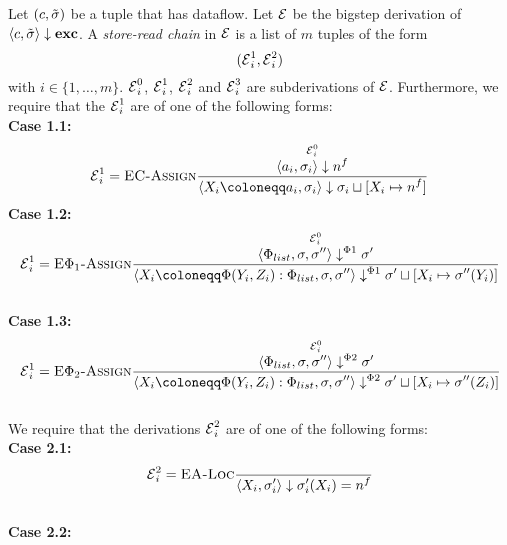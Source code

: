 \begin{definition}
    Let $(c, \tilde{\sigma}{})$ be a tuple that has dataflow.
    Let $\operatorname{\mathcal{E}}$ be the bigstep derivation of
    $\langle c, \tilde{\sigma}{} \rangle \downarrow \textbf{exc}$.
    A \emph{store-read chain} in $\operatorname{\mathcal{E}}$ is a list of $m$ tuples of the form
    \begin{equation*}
        (\operatorname{\mathcal{E}}^1_i, \operatorname{\mathcal{E}}^2_i)
    \end{equation*}
    with $i \in \{1, \ldots, m\}$.
    $\operatorname{\mathcal{E}}^0_i$, $\operatorname{\mathcal{E}}^1_i$, $\operatorname{\mathcal{E}}^2_i$ and $\operatorname{\mathcal{E}}^3_i$ are subderivations of $\operatorname{\mathcal{E}}$.
    Furthermore, we require that the $\operatorname{\mathcal{E}}^1_i$ are of one of the following forms:\\
    \textbf{Case 1.1:}\\
    \begin{align*}
        \E^1_i=\bsrule{EC-Assign}
        {\bigstepderiv{\E^0_i}{a_i}{\sigma_i}{\flagged{}}}
        {\bigstep{\storecmd{X_i}{a_i}}{\store_i}
        {\store_i \dunion [X_i \mapsto \flagged{}]}}
    \end{align*}
    \textbf{Case 1.2:}\\
    \begin{align*}
        \E^1_i=\bsrule{E$\Phi_1$-Assign}
        {\overset{\E^0_i}{\bigsteppl{\defaultphilist}{\store}{\store''}{\store'}}}
        {\bigsteppl{\phistore{X_i}{Y_i}{Z_i} : \defaultphilist}{\store}{\store''}{\storeassign{\store'}{X_i \mapsto \store''(Y_i)}}}\\
    \end{align*}\\
     \textbf{Case 1.3:}\\
     \begin{align*}
        \E^1_i=\bsrule{E$\Phi_2$-Assign}
        {\overset{\E^0_i}{\bigsteppr{\defaultphilist}{\store}{\store''}{\store'}}}
        {\bigsteppr{\phistore{X_i}{Y_i}{Z_i} : \defaultphilist}{\store}{\store''}{\storeassign{\store'}{X_i \mapsto \store''(Z_i)}}}\\
    \end{align*}\\
    We require that the derivations $\operatorname{\mathcal{E}}^2_i$ are of one of the following forms:\\
    \textbf{Case 2.1:}\\
    \begin{align*}
        \operatorname{\mathcal{E}}^2_i=\textsc{EA-Loc}\frac{\displaystyle }{\displaystyle \langle X_i, \sigma_i' \rangle \downarrow \sigma_i'(X_i) = n^f{}}
    \end{align*}\\
    \textbf{Case 2.2:}\\

\end{definition}
